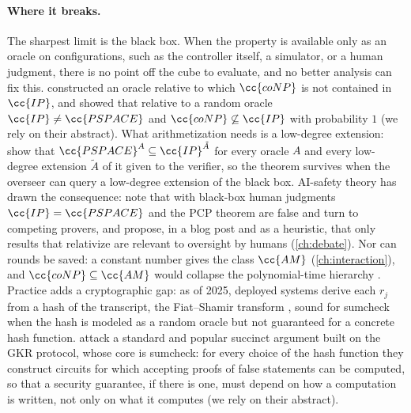 \begin{refsection}
\paragraph{Where it breaks.} The sharpest limit is the black box. When the property is available only as an oracle on configurations, such as the controller itself, a simulator, or a human judgment, there is no point off the cube to evaluate, and no better analysis can fix this. \Textcite{FortnowSipser1988} constructed an oracle relative to which $\cc{coNP}$ is not contained in $\cc{IP}$, and \textcite{ChangEtAl1994} showed that relative to a random oracle $\cc{IP}\ne\cc{PSPACE}$ and $\cc{coNP}\not\subseteq\cc{IP}$ with probability $1$ (we rely on their abstract). What arithmetization needs is a low-degree extension: \textcite{AaronsonWigderson2009} show that $\cc{PSPACE}^A\subseteq\cc{IP}^{\tilde A}$ for every oracle $A$ and every low-degree extension $\tilde A$ of it given to the verifier, so the theorem survives when the overseer can query a low-degree extension of the black box. AI-safety theory has drawn the consequence: \textcite{BrownCohenEtAl2024} note that with black-box human judgments $\cc{IP}=\cc{PSPACE}$ and the PCP theorem are false and turn to competing provers, and \textcite{IrvingMarshall2025} propose, in a blog post and as a heuristic, that only results that relativize are relevant to oversight by humans (\cref{ch:debate}). Nor can rounds be saved: a constant number gives the class $\cc{AM}$ (\cref{ch:interaction}), and $\cc{coNP}\subseteq\cc{AM}$ would collapse the polynomial-time hierarchy \parencite{BoppanaHastadZachos1987}. Practice adds a cryptographic gap: as of 2025, deployed systems derive each $r_j$ from a hash of the transcript, the Fiat--Shamir transform \parencite{FiatShamir1986}, sound for sumcheck when the hash is modeled as a random oracle \parencite{Thaler2022} but not guaranteed for a concrete hash function. \Textcite{KhovratovichRothblumSoukhanov2025} attack a standard and popular succinct argument built on the GKR protocol, whose core is sumcheck: for every choice of the hash function they construct circuits for which accepting proofs of false statements can be computed, so that a security guarantee, if there is one, must depend on how a computation is written, not only on what it computes (we rely on their abstract).


\end{refsection}
